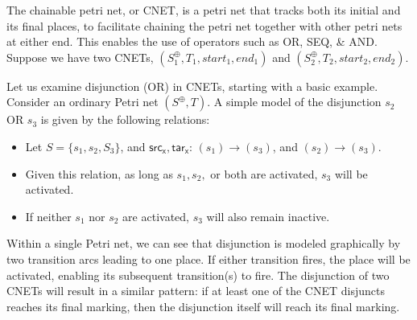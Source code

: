 The chainable petri net, or CNET, is a petri net that tracks both its initial and its final places, to facilitate chaining the petri net together with other petri nets at either end. This enables the use of operators such as OR, SEQ, \& AND.\\
Suppose we have two CNETs, $(S_1^\oplus, T_1, start_1, end_1)$ and $(S_2^\oplus, T_2, start_2, end_2)$. \\
\begin{example}
  \label{ex:OR-PN}
Let us examine disjunction (OR) in CNETs, starting with a basic example. Consider an ordinary Petri net $(S^\oplus, T)$. A simple model of the disjunction $s_2$ OR $s_3$ is given by the following relations:
  \begin{itemize}
  \item Let $S = \{s_1, s_2, S_3\}$, and $\mathsf{src_x}, \mathsf{tar_x}$: $(s_1) \to (s_3)$, and $(s_2) \to (s_3)$. 
  \item Given this relation, as long as $s_1, s_2,$ or both are activated, $s_3$ will be activated. 
  \item If neither $s_1$ nor $s_2$ are activated, $s_3$ will also remain inactive.  
  \end{itemize}
Within a single Petri net, we can see that disjunction is modeled graphically by two transition arcs leading to one place. If either transition fires, the place will be activated, enabling its subsequent transition(s) to fire. The disjunction of two CNETs will result in a similar pattern: if at least one of the CNET disjuncts reaches its final marking, then the disjunction itself will reach its final marking.   
\end{example}
